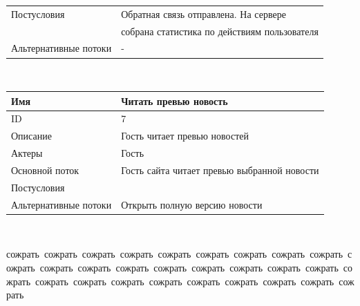 \begin{center}
\begin{tabular}{|l|l|}
        \hline
        Постусловия           & Обратная связь отправлена. На сервере                \\
        & собрана статистика по действиям пользователя         \\
        \hline
        Альтернативные потоки & -                                                    \\
        \hline
    \end{tabular}\\
    \vspace{0.5cm}
    \begin{tabular}{|l|l|}
        \hline
        Имя                   & Читать превью новость                       \\
        \hline
        ID                    & 7                                           \\
        \hline
        Описание              & Гость читает превью новостей                \\
        \hline
        Актеры                & Гость                                       \\
        \hline
        Основной поток        & Гость сайта читает превью выбранной новости \\
        \hline
        Постусловия           &                                             \\
        \hline
        Альтернативные потоки & Открыть полную версию новости               \\
        \hline
    \end{tabular}\\
\end{center}
\newpage
\BgThispage
\begin{flushright}
    \mbox{сожрать сожрать сожрать сожрать сожрать сожрать сожрать сожрать сожрать сожрать сожрать сожрать сожрать сожрать сожрать сожрать сожрать сожрать сожрать сожрать сожрать сожрать сожрать сожрать сожрать сожрать сожрать сожрать}
\end{flushright}
